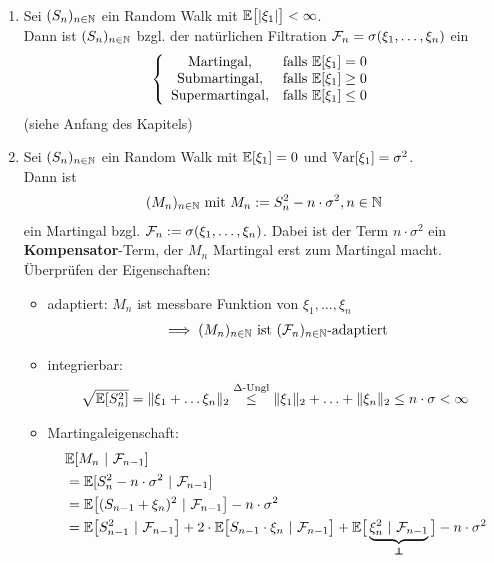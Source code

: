 \begin{beisp}\
	\begin{enumerate}[label=(\alph*)]
		\item Sei $(S_n)_{n\in\mathbb{N}}$ ein Random Walk mit $\mathbb{E}\big[|\xi_1|\big]<\infty$.\\
		Dann ist $(S_n)_{n\in\mathbb{N}}$ bzgl. der natürlichen Filtration $\mathcal{F}_n=\sigma(\xi_1,\ldots,\xi_n)$ ein
		\begin{align*}
			\left\lbrace\begin{array}{cl}
				\text{Martingal}, & \text{falls } \mathbb{E}[\xi_1]=0\\
				\text{Submartingal}, & \text{falls } \mathbb{E}[\xi_1]\geq0\\
				\text{Supermartingal}, & \text{falls } \mathbb{E}[\xi_1]\leq0\\
			\end{array}\right.
		\end{align*}
		(siehe Anfang des Kapitels)
		\item Sei $(S_n)_{n\in\mathbb{N}}$ ein Random Walk mit $\mathbb{E}[\xi_1]=0$ und $\mathbb{V}\text{ar}[\xi_1]=\sigma^2$.\\
		Dann ist 
		\begin{align*}
			(M_n)_{n\in\mathbb{N}}\text{ mit } M_n:=S_n^2-n\cdot\sigma^2,n\in\mathbb{N}
		\end{align*}
		ein Martingal bzgl. $\mathcal{F}_n:=\sigma(\xi_1,\ldots,\xi_n)$. 
		Dabei ist der Term $n\cdot\sigma^2$ ein \textbf{Kompensator}-Term, der $M_n$ Martingal erst zum Martingal macht.
		Überprüfen der Eigenschaften:
		\begin{itemize}
			\item adaptiert: $M_n$ ist messbare Funktion von $\xi_1,\ldots,\xi_n$
			\begin{align*}
				\implies(M_n)_{n\in\mathbb{N}} \text{ ist } (\mathcal{F}_n)_{n\in\mathbb{N}}\text{-adaptiert}
			\end{align*}
			\item integrierbar: 
			\begin{align*}
				\sqrt{\mathbb{E}[S_n^2]}=\Vert\xi_1+\ldots\xi_n\Vert_2\stackrel{\Delta\text{-Ungl}}{\leq}\Vert\xi_1\Vert_2+\ldots+\Vert\xi_n\Vert_2\leq n\cdot\sigma<\infty
			\end{align*}
			\item Martingaleigenschaft:
			\begin{align*}
				&\E[M_n~|~\F_{n-1}]\\
				&=\E[S_n^2-n\cdot\sigma^2~|~\F_{n-1}]\\
				&=\E\big[(S_{n-1}+\xi_n)^2~|~\F_{n-1}\big]-n\cdot\sigma^2\\
				&=\E\big[S_{n-1}^2~|~\F_{n-1}\big]+2\cdot\E\big[S_{n-1}\cdot\xi_n~|~\F_{n-1}\big]+\E\big[\underbrace{\xi_n^2~|~\F_{n-1}}_{\unab}\big]-n\cdot\sigma^2\\

\end{align*}
\end{itemize}
\end{enumerate}
\end{beisp}

